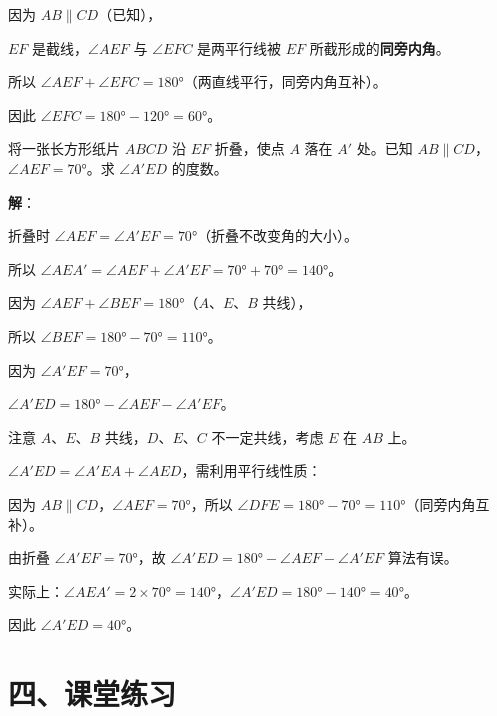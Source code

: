 \documentclass[12pt, a4paper]{ctexart}
\begin{document}
因为 $AB \parallel CD$（已知），

$EF$ 是截线，$\angle AEF$ 与 $\angle EFC$ 是两平行线被 $EF$ 所截形成的\textbf{同旁内角}。

所以 $\angle AEF + \angle EFC = 180°$（两直线平行，同旁内角互补）。

因此 $\angle EFC = 180° - 120° = \boxed{60°}$。

\vspace{6pt}

\begin{appbox}[【应用3】折纸中的平行线问题]
将一张长方形纸片 $ABCD$ 沿 $EF$ 折叠，使点 $A$ 落在 $A'$ 处。已知 $AB \parallel CD$，$\angle AEF = 70°$。求 $\angle A'ED$ 的度数。
\end{appbox}

\textbf{解}：

折叠时 $\angle AEF = \angle A'EF = 70°$（折叠不改变角的大小）。

所以 $\angle AEA' = \angle AEF + \angle A'EF = 70° + 70° = 140°$。

因为 $\angle AEF + \angle BEF = 180°$（$A$、$E$、$B$ 共线），

所以 $\angle BEF = 180° - 70° = 110°$。

因为 $\angle A'EF = 70°$，

$\angle A'ED = 180° - \angle AEF - \angle A'EF$。

注意 $A$、$E$、$B$ 共线，$D$、$E$、$C$ 不一定共线，考虑 $E$ 在 $AB$ 上。

$\angle A'ED = \angle A'EA + \angle AED$，需利用平行线性质：

因为 $AB \parallel CD$，$\angle AEF = 70°$，所以 $\angle DFE = 180° - 70° = 110°$（同旁内角互补）。

由折叠 $\angle A'EF = 70°$，故 $\angle A'ED = 180° - \angle AEF - \angle A'EF$ 算法有误。

实际上：$\angle AEA' = 2 \times 70° = 140°$，$\angle A'ED = 180° - 140° = 40°$。

因此 $\angle A'ED = \boxed{40°}$。

\section*{\textcolor{tipgreen}{四、课堂练习}}
\end{document}
